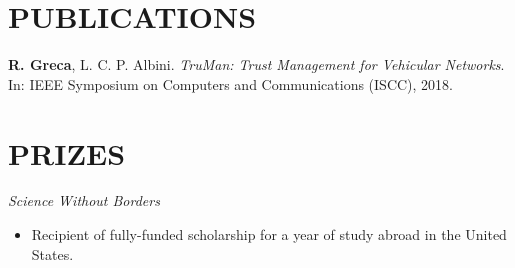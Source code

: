 \documentclass[margin]{res}
\begin{document}
\begin{resume}
		\section{PUBLICATIONS}
			\textbf{R. Greca}, L. C. P. Albini. {\sl TruMan: Trust Management for Vehicular Networks}. In: IEEE Symposium on Computers and Communications (ISCC), 2018.
	
		\section{PRIZES}
			{\sl Science Without Borders}
			\begin{itemize}
				\item[] Recipient of fully-funded scholarship for a year of study abroad in the United States.
			\end{itemize}

			



\end{resume}
\end{document}
